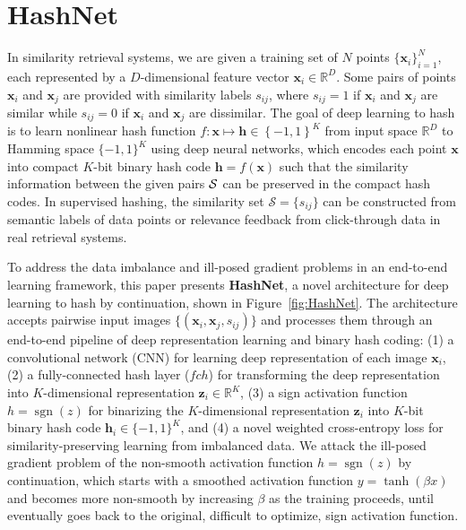 \documentclass[10pt,twocolumn,letterpaper]{article}
\begin{document}
\section{HashNet}
In similarity retrieval systems, we are given a training set of $N$ points $\{{\bm x}_i\}_{i=1}^N$, each represented by a $D$-dimensional feature vector ${\bm x}_i \in \mathbb{R}^{D}$.
Some pairs of points ${\bm x}_i$ and ${\bm x}_j$ are provided with similarity labels $s_{ij}$, where $s_{ij} = 1$ if ${\bm x}_i$ and ${\bm x}_j$ are similar while $s_{ij} = 0$ if ${\bm x}_i$ and ${\bm x}_j$ are dissimilar. 
The goal of deep learning to hash is to learn nonlinear hash function $f:{\bm{x}} \mapsto {\bm{h}} \in {\left\{ { - 1,1} \right\}^K}$ from input space $\mathbb{R}^D$ to Hamming space $\{-1,1\}^K$ using deep neural networks, which encodes each point ${\bm x}$ into compact $K$-bit binary hash code ${\bm h} = f({\bm x})$ such that the similarity information between the given pairs ${\cal S}$ can be preserved in the compact hash codes. In supervised hashing, the similarity set $\mathcal{S} = \{s_{ij}\}$ can be constructed from semantic labels of data points or relevance feedback from click-through data in real retrieval systems.

To address the data imbalance and ill-posed gradient problems in an end-to-end learning framework, this paper presents \textbf{HashNet}, a novel architecture for deep learning to hash by continuation, shown in Figure~\ref{fig:HashNet}. 
The architecture accepts pairwise input images $\{({\bm x}_i, {\bm x}_j, s_{ij})\}$ and processes them through an end-to-end pipeline of deep representation learning and binary hash coding: (1) a convolutional network (CNN) for learning deep representation of each image ${\bm x}_i$, (2) a fully-connected hash layer ($fch$) for transforming the deep representation into $K$-dimensional representation ${\bm z}_i \in \mathbb{R}^K$, (3) a sign activation function $h = \operatorname{sgn} \left( z \right)$ for binarizing the $K$-dimensional representation ${\bm z}_i$ into $K$-bit binary hash code ${\bm h}_i \in \{-1,1\}^K$, and (4) a novel weighted cross-entropy loss for similarity-preserving learning from imbalanced data. 
We attack the ill-posed gradient problem of the non-smooth activation function $h = \operatorname{sgn} \left( z \right)$ by continuation, which starts with a smoothed activation function $y = \operatorname{tanh} \left( \beta x \right)$ and becomes more non-smooth by increasing $\beta$ as the training proceeds, until eventually goes back to the original, difficult to optimize, sign activation function.
\end{document}
